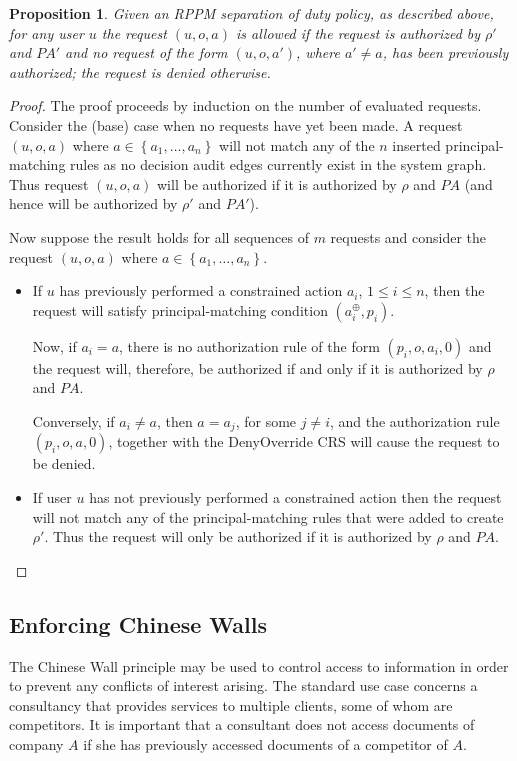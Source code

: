 \documentclass{article}
\newtheorem{proposition}{Proposition}
\newcommand{\set}[1]{\ensuremath{\left\{#1\right\}}} \newcommand{\sett}[1]{\ensuremath{\left\{\textit{#1}\right\}}} \newcommand{\tuple}[1]{\ensuremath{\left(#1\right)}} \newcommand{\tuplet}[1]{\ensuremath{\left(\textit{#1}\right)}}
\newcommand{\audita}[1]{\ensuremath{#1^\oplus}}
\newcommand{\pa}{\mathit{PA}}
\begin{document}
\begin{proposition}\label{prop:separation-of-duty}
    Given an RPPM separation of duty policy, as described above, for any user $u$ the request $(u,o,a)$ is allowed if the request is authorized by $\rho'$ and $\pa'$ and no request of the form $(u,o,a')$, where $a' \neq a$, has been previously authorized; the request is denied otherwise.
\end{proposition}

\begin{proof}
    The proof proceeds by induction on the number of evaluated requests.
    Consider the (base) case when no requests have yet been made.
    A request $(u,o,a)$ where $a \in \set{a_1, \dots, a_n}$ will not match any of the $n$ inserted principal-matching rules as no decision audit edges currently exist in the system graph.
    Thus request $(u,o,a)$ will be authorized if it is authorized by $\rho$ and $\pa$ (and hence will be authorized by $\rho'$ and $\pa'$).

    Now suppose the result holds for all sequences of $m$ requests and consider the request $(u,o,a)$ where $a \in \set{a_1, \dots, a_n}$.\begin{itemize}
        \item If $u$ has previously performed a constrained action $a_i$, $1 \le i \le n$, then the request will satisfy principal-matching condition $(\audita{a_i}, p_i)$.
	
	      Now, if $a_i = a$, there is no authorization rule of the form $(p_i,o,a_i,0)$ and the request will, therefore, be authorized if and only if it is authorized by $\rho$ and $\pa$.
	
	      Conversely, if $a_i \ne a$, then $a = a_j$, for some $j \ne i$, and the authorization rule $(p_i, o, a, 0)$, together with the \textsf{DenyOverride} CRS will cause the request to be denied.
        \item If user $u$ has not previously performed a constrained action then the request will not match any of the principal-matching rules that were added to create $\rho'$.
	      Thus the request will only be authorized if it is authorized by $\rho$ and $\pa$.
\end{itemize}
\end{proof}
\subsection{Enforcing Chinese Walls}\label{sec:audit:chinesewall}
The Chinese Wall principle may be used to control access to information in order to prevent any conflicts of interest arising.
The standard use case concerns a consultancy that provides services to multiple clients, some of whom are competitors.
It is important that a consultant does not access documents of company $A$ if she has previously accessed documents of a competitor of $A$.
\end{document}
